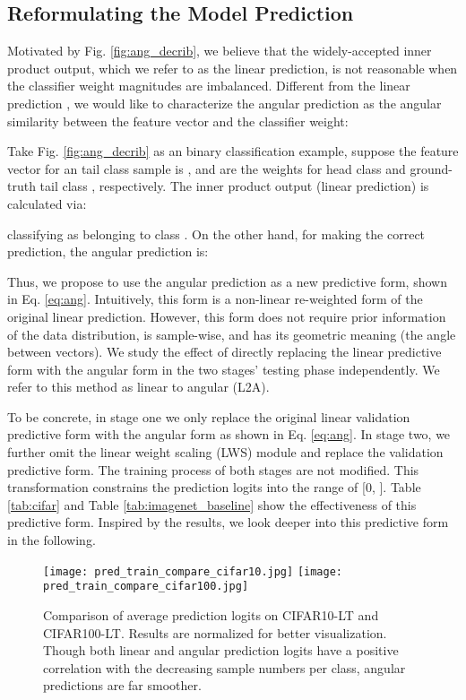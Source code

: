 \documentclass[10pt,twocolumn,letterpaper]{article}
\begin{document}
\subsection{Reformulating the Model Prediction}
Motivated by Fig. \ref{fig:ang_decrib}, we believe that the widely-accepted inner product output, which we refer to as the linear prediction, is not reasonable when the classifier weight magnitudes are imbalanced. Different from the linear prediction , we would like to characterize the angular prediction as the angular similarity between the feature vector and the classifier weight:


Take Fig. \ref{fig:ang_decrib} as an binary classification example, suppose the feature vector for an tail class sample  is ,  and  are the weights for head class  and ground-truth tail class , respectively. The inner product output (linear prediction) is calculated via:

classifying  as belonging to class . On the other hand, for making the correct prediction, the angular prediction is:


Thus, we propose to use the angular prediction as a new predictive form, shown in Eq. \ref{eq:ang}. Intuitively, this form is a non-linear re-weighted form of the original linear prediction. However, this form does not require prior information of the data distribution, is sample-wise, and has its geometric meaning (the angle between vectors). We study the effect of directly replacing the linear predictive form with the angular form in the two stages' testing phase independently. We refer to this method as linear to angular (L2A). 

To be concrete, in stage one we only replace the original linear validation predictive form with the angular form as shown in Eq. \ref{eq:ang}. In stage two, we further omit the linear weight scaling (LWS) module and replace the validation predictive form. The training process of both stages are not modified. This transformation constrains the prediction logits into the range of [0, ]. Table \ref{tab:cifar} and Table \ref{tab:imagenet_baseline} show the effectiveness of this predictive form. Inspired by the results, we look deeper into this predictive form in the following.

\begin{figure}[tb!]
  \centering
  \texttt{[image: pred\_train\_compare\_cifar10.jpg]}
   \texttt{[image: pred\_train\_compare\_cifar100.jpg]}\vspace{-5pt}
   \caption{Comparison of average prediction logits on CIFAR10-LT and CIFAR100-LT. Results are normalized for better visualization. Though both linear and angular prediction logits have a positive correlation with the decreasing sample numbers per class, angular predictions are far smoother.}
   \label{fig:smooth_compare}
   \vspace{-5pt}
\end{figure}
\end{document}
